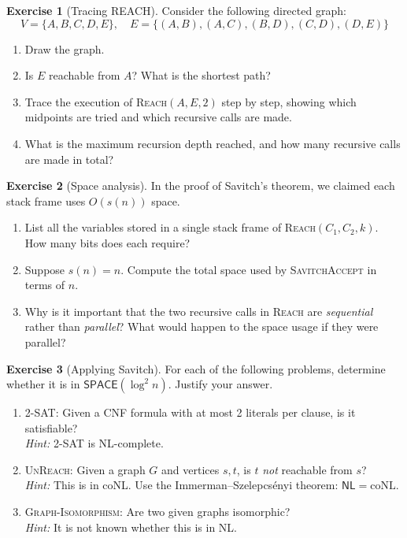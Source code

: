 \documentclass[12pt,a4paper]{article}
\theoremstyle{plain}
\theoremstyle{definition}
\newtheorem{exercise}{Exercise}[section]
\theoremstyle{remark}
\newcommand{\SPACE}{\mathsf{SPACE}}
\newcommand{\NL}{\mathsf{NL}}
\begin{document}
\begin{exercise}[Tracing REACH]\label{ex:trace}
Consider the following directed graph:
\[
  V = \{A, B, C, D, E\}, \quad E = \{(A,B),(A,C),(B,D),(C,D),(D,E)\}
\]
\begin{enumerate}[label=(\alph*)]
  \item Draw the graph.
  \item Is $E$ reachable from $A$? What is the shortest path?
  \item Trace the execution of \textsc{Reach}$(A, E, 2)$ step by step, showing which midpoints are tried and which recursive calls are made.
  \item What is the maximum recursion depth reached, and how many recursive calls are made in total?
\end{enumerate}
\end{exercise}

\begin{exercise}[Space analysis]\label{ex:space}
In the proof of Savitch's theorem, we claimed each stack frame uses $O(s(n))$ space.
\begin{enumerate}[label=(\alph*)]
  \item List all the variables stored in a single stack frame of \textsc{Reach}$(C_1, C_2, k)$. How many bits does each require?
  \item Suppose $s(n) = n$. Compute the total space used by \textsc{SavitchAccept} in terms of $n$.
  \item Why is it important that the two recursive calls in \textsc{Reach} are \emph{sequential} rather than \emph{parallel}? What would happen to the space usage if they were parallel?
\end{enumerate}
\end{exercise}

\begin{exercise}[Applying Savitch]\label{ex:apply}
For each of the following problems, determine whether it is in $\SPACE(\log^2 n)$. Justify your answer.
\begin{enumerate}[label=(\alph*)]
  \item \textsc{2-SAT}: Given a CNF formula with at most 2 literals per clause, is it satisfiable?\\
  \textit{Hint:} 2-SAT is NL-complete.
  \item \textsc{UnReach}: Given a graph $G$ and vertices $s, t$, is $t$ \emph{not} reachable from $s$?\\
  \textit{Hint:} This is in coNL. Use the Immerman--Szelepcs\'{e}nyi theorem: $\NL = \text{coNL}$.
  \item \textsc{Graph-Isomorphism}: Are two given graphs isomorphic?\\
  \textit{Hint:} It is not known whether this is in NL.
\end{enumerate}
\end{exercise}
\end{document}
